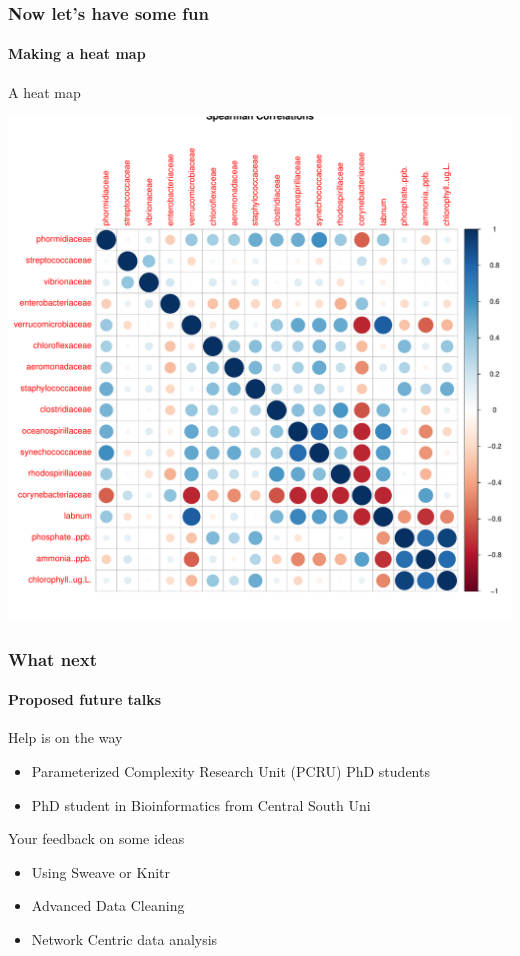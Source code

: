 \documentclass[12pt]{beamer}\usepackage[]{graphicx}\usepackage[]{color}
\newenvironment{knitrout}{}{} %
\begin{document}
 \begin{frame}[fragile]
  \frametitle{Now let's have some fun}
  \framesubtitle{Making a heat map}
\begin{block}{A heat map}
\end{block}
\begin{knitrout}
\color{fgcolor}
\includegraphics[width=.85\linewidth]{figure/chunk12i-1} 

\end{knitrout}
\end{frame}
\begin{frame}
  \frametitle{What next}
  \framesubtitle{Proposed future talks}
  \begin{block}{Help is on the way}
  \begin{itemize}
  \item Parameterized Complexity Research Unit (PCRU) PhD students
  \item PhD student in Bioinformatics from Central South Uni
  \end{itemize}
  \end{block}
  \begin{block}{Your feedback on some ideas}
  \begin{itemize}
  \item Using Sweave or Knitr
  \item Advanced Data Cleaning 
  \item Network Centric data analysis
  \end{itemize}
  \end{block}
\end{frame}
\end{document}
